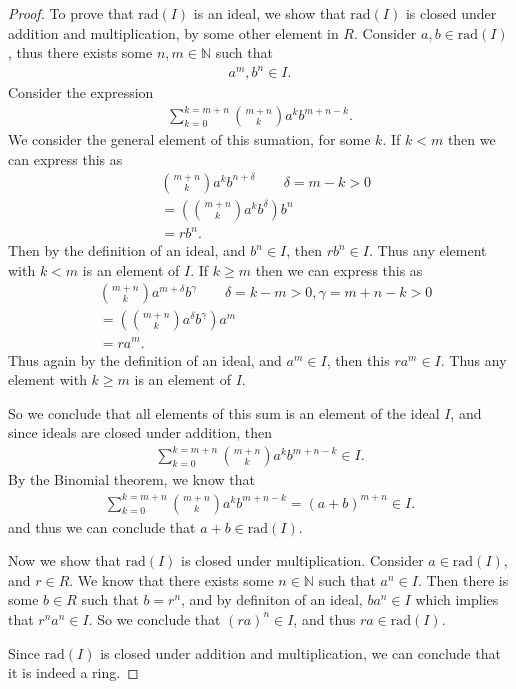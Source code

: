 \documentclass[10pt]{armath}
\newcommand{\N}{\mathbb{N}}
\newcommand{\rad}[1]{\text{rad}\left(#1\right)}
\begin{document}
\begin{proof}
  To prove that $\rad{I}$ is an ideal, we show that $\rad{I}$ is closed under
  addition and multiplication, by some other element in $R$. Consider
  $a,b\in\rad{I}$, thus there exists some $n,m\in\N$ such that
  \begin{align*}
     a^m,b^n\in I.
  \end{align*}
  Consider the expression
  \begin{align*}
    \sum_{k=0}^{k=m+n}{m+n\choose k}a^kb^{m+n-k}.
  \end{align*}
  We consider the general element of this sumation, for some $k$. If $k<m$ then
  we can express this as
  \begin{align*}
    &{m+n\choose k}a^kb^{n+\delta}\qquad\delta=m-k>0\\
    &=\left({m+n\choose k}a^kb^\delta\right) b^n\\
    &=rb^n.
  \end{align*}
  Then by the definition of an ideal, and $b^n\in I$, then $rb^n\in I$. Thus
  any element with $k<m$ is an element of $I$. If $k\geq m$ then we can express
  this as
  \begin{align*}
     &{m+n\choose k}a^{m+\delta}b^{\gamma}\qquad\delta=k-m>0, \gamma=m+n-k>0\\
     &=\left({m+n\choose k}a^\delta b^\gamma\right)a^m\\
     &=ra^m.
  \end{align*}
  Thus again by the definition of an ideal, and $a^m\in I$, then this $ra^m\in
  I$. Thus any element with $k\geq m$ is an element of $I$.

  So we conclude that all elements of this sum is an element of the ideal $I$,
  and since ideals are closed under addition, then
  \begin{align*}
    \sum_{k=0}^{k=m+n}{m+n\choose k}a^kb^{m+n-k}\in I.
  \end{align*}
  By the Binomial theorem, we know that
  \begin{align*}
    \sum_{k=0}^{k=m+n}{m+n\choose k}a^kb^{m+n-k}={\left(a+b\right)}^{m+n}\in I.
  \end{align*}
  and thus we can conclude that $a+b\in\rad{I}$.

  Now we show that $\rad{I}$ is closed under multiplication. Consider
  $a\in\rad{I}$, and $r\in R$. We know that there exists some $n\in\N$ such
  that $a^n\in I$. Then there is some $b\in R$ such that $b=r^n$, and by
  definiton of an ideal, $ba^n\in I$ which implies that $r^na^n\in I$. So we
  conclude that ${\left(ra\right)}^n\in I$, and thus $ra\in\rad{I}$.

  Since $\rad{I}$ is closed under addition and multiplication, we can conclude
  that it is indeed a ring.
\end{proof}
\end{document}
